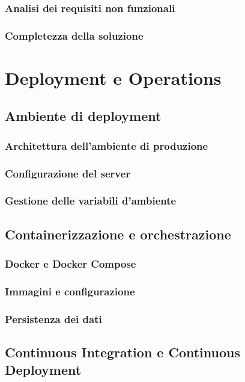 \documentclass[12pt,a4paper,oneside]{report}
\begin{document}
\subsection{Analisi dei requisiti non funzionali}
\subsection{Completezza della soluzione}





\chapter{Deployment e Operations}
\section{Ambiente di deployment}
\subsection{Architettura dell'ambiente di produzione}
\subsection{Configurazione del server}
\subsection{Gestione delle variabili d'ambiente}

\section{Containerizzazione e orchestrazione}
\subsection{Docker e Docker Compose}
\subsection{Immagini e configurazione}
\subsection{Persistenza dei dati}

\section{Continuous Integration e Continuous Deployment}
\end{document}
